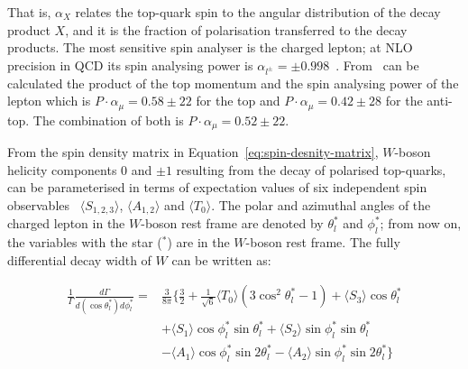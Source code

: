 That is, $\alpha_X$ relates the top-quark spin to the angular distribution of the decay product $X$, and it is the fraction of polarisation transferred to the decay products.
The most sensitive spin analyser is the charged lepton; at NLO precision in QCD its spin analysing power is $\alpha_{l^{\pm}} = \pm 0.998$~\cite{Brandenburg:2002xr}. From~\cite{Khachatryan:2015dzz} can be calculated the product of the top momentum and the spin analysing power of the lepton which is $P\cdot \alpha_{\mu} = 0.58 \pm 22$ for the top and $P\cdot \alpha_\mu = 0.42 \pm 28$ for the anti-top. The combination of both is $P\cdot \alpha_\mu = 0.52 \pm 22$. %



From the spin density matrix in Equation~\eqref{eq:spin-desnity-matrix}, $W$-boson helicity components 0 and $\pm 1$ resulting from the decay of  polarised top-quarks, can be parameterised in terms of expectation values of six independent spin observables~\cite{Probing} $\langle S_{1, 2, 3} \rangle$, $\langle A_{1, 2} \rangle$ and $\langle T_{0} \rangle$. The polar and azimuthal angles of the charged lepton in the $W$-boson rest frame are denoted by $\theta^{*}_l$ and $\phi^{*}_l$; from now on, the variables with the star ($^{*}$) are in the $W$-boson rest frame. The fully differential decay width of $W$ can be written as:

\begin{equation} \label{eq:angdist}
\begin{split}
 \frac{1}{\Gamma}\frac{d\Gamma}{d(\cos \theta_l^{*})d\phi_l^{*}} = & \frac{3}{8 \pi} \Big \{ \frac{3}{2}+\frac{1}{\sqrt{6}} \langle T_{0} \rangle (3 \cos^{2}\theta_l^{*}-1)+ \langle S_{3} \rangle \cos\theta_l^{*} \\
 & + \langle S_{1} \rangle \cos\phi_l^{*} \sin\theta_l^{*} +  \langle S_{2} \rangle \sin\phi_l^{*} \sin\theta_l^{*} \\
 & - \langle A_{1} \rangle \cos\phi_l^{*} \sin2\theta_l^{*} - \langle A_{2} \rangle \sin\phi_l^{*} \sin2\theta_l^{*} \Big \} 
\end{split}
\end{equation} 

